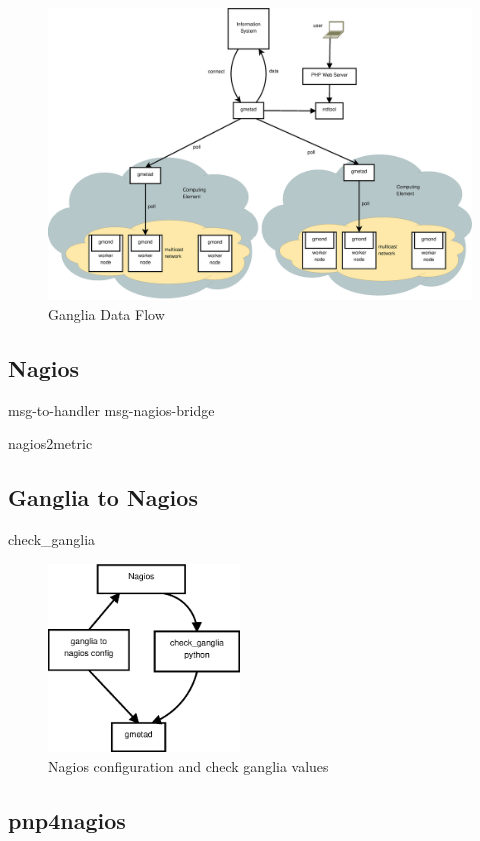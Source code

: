 \begin{figure}[htb]
\centering
 \includegraphics[width=6in]{images/ganglia_data_flow.eps}
\caption{Ganglia Data Flow}
\label{figure:ganglia_dataflow}
\end{figure}
\newpage

\subsection{Nagios}
msg-to-handler msg-nagios-bridge
\newpage

nagios2metric
\newpage

\subsection{Ganglia to Nagios}
check\_ganglia
\begin{figure}[htb]
\centering
 \includegraphics[width=2in]{images/nagios_check_ganglia.eps}
\caption{Nagios configuration and check ganglia values}
\label{figure:nagios_ganglia}
\end{figure}
\newpage

\subsection{pnp4nagios}

